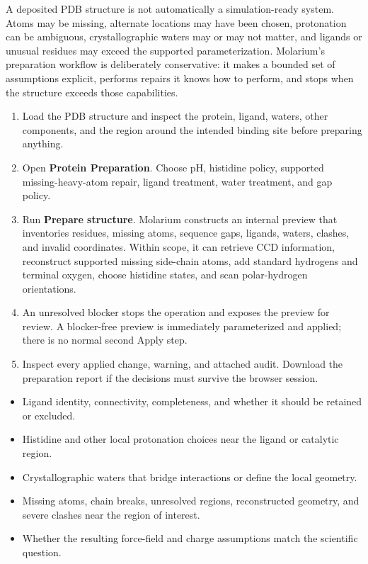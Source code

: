 
A deposited PDB structure is not automatically a simulation-ready system. Atoms may be missing, alternate locations may have been chosen, protonation can be ambiguous, crystallographic waters may or may not matter, and ligands or unusual residues may exceed the supported parameterization. Molarium's preparation workflow is deliberately conservative: it makes a bounded set of assumptions explicit, performs repairs it knows how to perform, and stops when the structure exceeds those capabilities.


\begin{enumerate}
\item Load the PDB structure and inspect the protein, ligand, waters, other components, and the region around the intended binding site before preparing anything.
\item Open \textbf{Protein Preparation}. Choose pH, histidine policy, supported missing-heavy-atom repair, ligand treatment, water treatment, and gap policy.
\item Run \textbf{Prepare structure}. Molarium constructs an internal preview that inventories residues, missing atoms, sequence gaps, ligands, waters, clashes, and invalid coordinates. Within scope, it can retrieve CCD information, reconstruct supported missing side-chain atoms, add standard hydrogens and terminal oxygen, choose histidine states, and scan polar-hydrogen orientations.
\item An unresolved blocker stops the operation and exposes the preview for review. A blocker-free preview is immediately parameterized and applied; there is no normal second Apply step.
\item Inspect every applied change, warning, and attached audit. Download the preparation report if the decisions must survive the browser session.
\end{enumerate}


\begin{itemize}
\item Ligand identity, connectivity, completeness, and whether it should be retained or excluded.
\item Histidine and other local protonation choices near the ligand or catalytic region.
\item Crystallographic waters that bridge interactions or define the local geometry.
\item Missing atoms, chain breaks, unresolved regions, reconstructed geometry, and severe clashes near the region of interest.
\item Whether the resulting force-field and charge assumptions match the scientific question.
\end{itemize}

